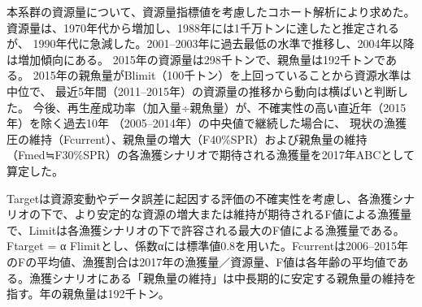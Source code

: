 本系群の資源量について、資源量指標値を考慮したコホート解析により求めた。
資源量は、1970年代から増加し、1988年には1千万トンに達したと推定されるが、
1990年代に急減した。2001--2003年に過去最低の水準で推移し、2004年以降は増加傾向にある。
2015年の資源量は298千トンで、親魚量は192千トンである。
2015年の親魚量がBlimit（100千トン）を上回っていることから資源水準は中位で、
最近5年間（2011--2015年）の資源量の推移から動向は横ばいと判断した。
今後、再生産成功率（加入量÷親魚量）が、不確実性の高い直近年（2015年）を除く過去10年
（2005--2014年）の中央値で継続した場合に、
現状の漁獲圧の維持（Fcurrent）、親魚量の増大（F40\%SPR）および親魚量の維持（Fmed≒F30\%SPR）の各漁獲シナリオで期待される漁獲量を2017年ABCとして算定した。


Targetは資源変動やデータ誤差に起因する評価の不確実性を考慮し、各漁獲シナリオの下で、より安定的な資源の増大または維持が期待されるF値による漁獲量で、Limitは各漁獲シナリオの下で許容される最大のF値による漁獲量である。Ftarget = α Flimitとし、係数αには標準値0.8を用いた。Fcurrentは2006--2015年のFの平均値、漁獲割合は2017年の漁獲量／資源量、F値は各年齢の平均値である。漁獲シナリオにある「親魚量の維持」は中長期的に安定する親魚量の維持を指す。{\thisyrad}年の親魚量は192千トン。
